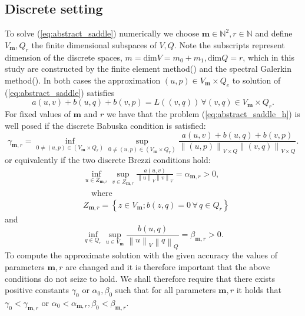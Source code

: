 \documentclass[a4paper,10pt]{article}
\newcommand{\norm}[1]{\ensuremath{\left\|#1\right\|}}
\newcommand{\mm}{\ensuremath{\mathbf{m}}}
\begin{document}
  \subsection{Discrete setting}
  To solve (\ref{eq:abstract_saddle}) numerically we choose $\mm\in\mathbb{N}^2, 
r\in\mathbb{N}$ and define $V_\mm, Q_r$ the finite dimensional subspaces
of $V, Q$. Note the subscripts represent dimension of the discrete spaces,
$m=\text{dim}{V}=m_0+m_1, \text{dim}{Q}=r$, which in this study are constructed
by the finite element method(\cite{scott}) and the spectral Galerkin
method(\cite{shen_book}). In both cases
the approximation $(u, p)\in V_{\mm}\times Q_e$ 
to solution of (\ref{eq:abstract_saddle}) satisfies
  \begin{equation}
    \label{eq:abstract_saddle_h}
    a(u, v) + b(u, q) + b(v, p) = L((v, q))\,\forall (v, q) \in V_{\mm}\times Q_r.
  \end{equation}
  For fixed values of $\mm$ and $r$ we have that the problem
  (\ref{eq:abstract_saddle_h}) is well posed if the discrete Babuska condition
  is satisfied:
  \begin{equation}
    \label{eq:babuska_h}
    \gamma_{\mm, r}=\inf_{0\neq(u, p)\in \left(V_{\mm}\times Q_r\right)}
    \sup_{0\neq(u, p)\in \left(V_{\mm}\times Q_r\right)}
    \frac{a(u, v) + b(u, q) + b(v, p)}
    {\norm{(u, p)}_{V\times Q}  \norm{(v, q)}_{V\times Q}}.
  \end{equation}
  or equivalently if the two discrete Brezzi conditions hold:
  \begin{equation}
    \label{eq:brezzi_coer_h}
    \begin{aligned}
      &\inf_{u\in Z_{\mm, r}}
    \sup_{v\in Z_{\mm, r}}
    \frac{a(u,v)}{\norm{u}_V\norm{v}_V} = \alpha_{\mm, r} > 0,\\
    &\quad\text{where}\\
    & Z_{\mm, r} = \left\{z\in V_{\mm}; b(z, q)=0\,\forall\,q\in Q_r\right\}
    \end{aligned}
  \end{equation}
  and 
  \begin{equation}
    \label{eq:brezzi_infsup_h}
    \inf_{q\in Q_r}\sup_{u \in V_\mm} \frac{b(u, q)}{\norm{u}_V\norm{q}_Q}
    = \beta _{\mm, r}> 0.
  \end{equation}
  To compute the approximate solution with the given accuracy the values of
  parameters $\mm, r$ are changed and it is therefore important that
  the above conditions do not seize to hold. We shall therefore require that
  there exists positive constants $\gamma_0$ or $\alpha_0, \beta_0$ such that
  for all parameters $\mm, r$ it holds that $\gamma_0<\gamma_{\mm, r}$ or
  $\alpha_0<\alpha_{\mm, r}, \beta_0<\beta_{\mm, r}$.
 
\end{document}
